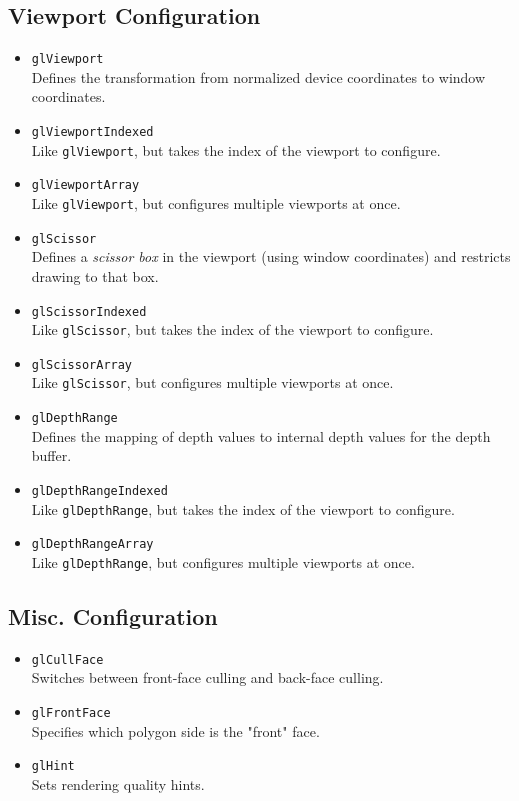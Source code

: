 \documentclass[12pt]{article}
\begin{document}
\subsection{Viewport Configuration}
\begin{itemize}
\item \texttt{glViewport} \\
	Defines the transformation from normalized device coordinates to window coordinates.
\item \texttt{glViewportIndexed} \\
	Like \texttt{glViewport}, but takes the index of the viewport to configure.
\item \texttt{glViewportArray} \\
	Like \texttt{glViewport}, but configures multiple viewports at once.
\item \texttt{glScissor} \\
	Defines a \textit{scissor box} in the viewport (using window coordinates) and restricts drawing to that box.
\item \texttt{glScissorIndexed} \\
	Like \texttt{glScissor}, but takes the index of the viewport to configure.
\item \texttt{glScissorArray} \\
	Like \texttt{glScissor}, but configures multiple viewports at once.
\item \texttt{glDepthRange} \\
	Defines the mapping of depth values to internal depth values for the depth buffer.	
\item \texttt{glDepthRangeIndexed} \\
	Like \texttt{glDepthRange}, but takes the index of the viewport to configure.
\item \texttt{glDepthRangeArray} \\
	Like \texttt{glDepthRange}, but configures multiple viewports at once.
\end{itemize}



\subsection{Misc. Configuration}
\begin{itemize}
\item \texttt{glCullFace} \\
	Switches between front-face culling and back-face culling.
\item \texttt{glFrontFace} \\
	Specifies which polygon side is the "front" face.
\item \texttt{glHint} \\
	Sets rendering quality hints.
\end{itemize}
\end{document}
